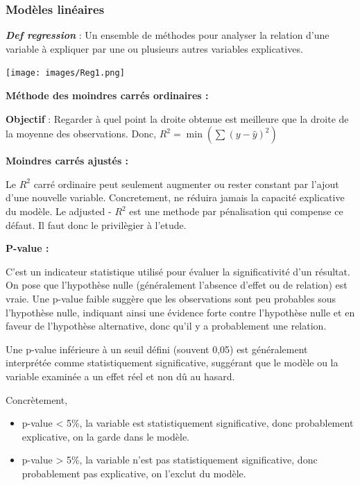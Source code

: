 \documentclass[
  letterpaper,
  DIV=11,
  numbers=noendperiod]{scrartcl}
\begin{document}
\subsubsection{Modèles linéaires}\label{moduxe8les-linuxe9aires}

\textbf{\emph{Def regression}} : Un ensemble de méthodes pour analyser
la relation d'une variable à expliquer par une ou plusieurs autres
variables explicatives.

\texttt{[image: images/Reg1.png]}\hfill

\textbf{Méthode des moindres carrés ordinaires :}

\textbf{Objectif} : Regarder à quel point la droite obtenue est
meilleure que la droite de la moyenne des observations. Donc,
\(R^2 = \min\left(\sum(y - \hat{y})^2\right)\)

\textbf{Moindres carrés ajustés :}

Le \(R^2\) carré ordinaire peut seulement augmenter ou rester constant
par l'ajout d'une nouvelle variable. Concretement, ne réduira jamais la
capacité explicative du modèle. Le adjusted - \(R^2\) est une methode
par pénalisation qui compense ce défaut. Il faut donc le privilègier à
l'etude.

\textbf{P-value :}

C'est un indicateur statistique utilisé pour évaluer la significativité
d'un résultat. On pose que l'hypothèse nulle (généralement l'absence
d'effet ou de relation) est vraie. Une p-value faible suggère que les
observations sont peu probables sous l'hypothèse nulle, indiquant ainsi
une évidence forte contre l'hypothèse nulle et en faveur de l'hypothèse
alternative, donc qu'il y a probablement une relation.

Une p-value inférieure à un seuil défini (souvent 0,05) est généralement
interprétée comme statistiquement significative, suggérant que le modèle
ou la variable examinée a un effet réel et non dû au hasard.

Concrètement,

\begin{itemize}
\item
  p-value \textless{} 5\%, la variable est statistiquement
  significative, donc probablement explicative, on la garde dans le
  modèle.
\item
  p-value \textgreater{} 5\%, la variable n'est pas statistiquement
  significative, donc probablement pas explicative, on l'exclut du
  modèle.
\end{itemize}
\end{document}

